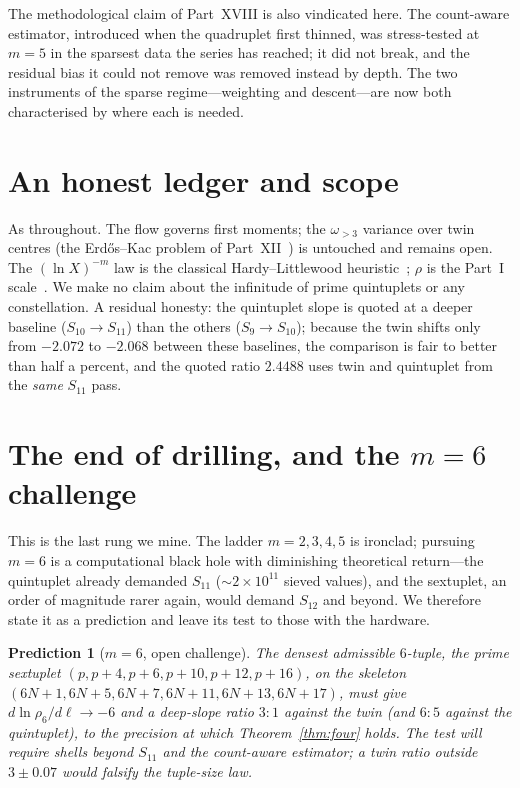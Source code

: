 \documentclass[11pt]{article}
\newtheorem{prediction}{Prediction}
\begin{document}
The methodological claim of Part~XVIII is also vindicated here. The count-aware
estimator, introduced when the quadruplet first thinned, was stress-tested at
$m=5$ in the sparsest data the series has reached; it did not break, and the
residual bias it could not remove was removed instead by depth. The two
instruments of the sparse regime---weighting and descent---are now both
characterised by where each is needed.

\section{An honest ledger and scope}

As throughout. The flow governs first moments; the $\omega_{>3}$ variance over
twin centres (the Erd\H{o}s--Kac problem of Part~XII~\cite{ChenXII}) is untouched
and remains open. The $(\ln X)^{-m}$ law is the classical Hardy--Littlewood
heuristic~\cite{HL}; $\rho$ is the Part~I scale~\cite{ChenI}. We make no claim
about the infinitude of prime quintuplets or any constellation. A residual
honesty: the quintuplet slope is quoted at a deeper baseline ($S_{10}\!\to\!
S_{11}$) than the others ($S_9\!\to\!S_{10}$); because the twin shifts only from
$-2.072$ to $-2.068$ between these baselines, the comparison is fair to better
than half a percent, and the quoted ratio $2.4488$ uses twin and quintuplet from
the \emph{same} $S_{11}$ pass.

\section{The end of drilling, and the $m=6$ challenge}

This is the last rung we mine. The ladder $m=2,3,4,5$ is ironclad; pursuing $m=6$
is a computational black hole with diminishing theoretical return---the
quintuplet already demanded $S_{11}$ ($\sim2\times10^{11}$ sieved values), and the
sextuplet, an order of magnitude rarer again, would demand $S_{12}$ and beyond.
We therefore state it as a prediction and leave its test to those with the
hardware.

\begin{prediction}[$m=6$, open challenge]\label{pred:m6}
The densest admissible $6$-tuple, the prime sextuplet $(p,p+4,p+6,p+10,p+12,p+16)$,
on the skeleton $(6N+1,6N+5,6N+7,6N+11,6N+13,6N+17)$, must give
$d\ln\rho_6/d\ell\to-6$ and a deep-slope ratio $3{:}1$ against the twin (and
$6{:}5$ against the quintuplet), to the precision at which Theorem~\ref{thm:four}
holds. The test will require shells beyond $S_{11}$ and the count-aware estimator;
a twin ratio outside $3\pm0.07$ would falsify the tuple-size law.
\end{prediction}
\end{document}
